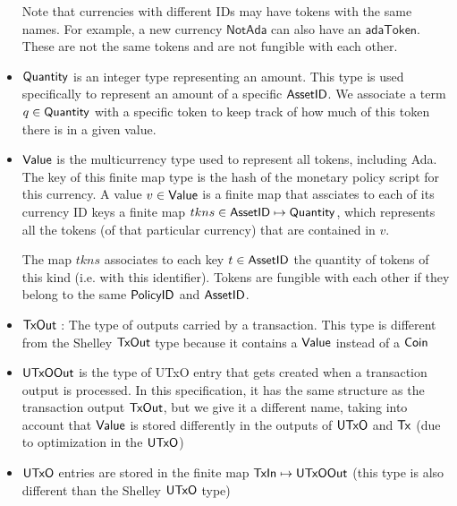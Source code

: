 \begin{itemize}
  Note that currencies with different IDs may have tokens with the same names.
  For example, a new currency $\mathsf{NotAda}$ can also have an $\mathsf{adaToken}$.
  These are not the same tokens and are not fungible with each other.

  \item $\mathsf{Quantity}$ is an integer type representing an amount. This type is used
  specifically to represent an amount of a specific $\mathsf{AssetID}$. We associate
  a term $q\in\mathsf{Quantity}$ with a specific token to keep track of how much of
  this token there is in a given value.

  \item $\mathsf{Value}$ is the multicurrency type used to represent
  all tokens, including Ada. The key of this finite map type is
  the hash of the monetary policy script for this currency.
  A value $v\in\mathsf{Value}$ is a finite map that assciates to each of its
  currency ID keys a finite map $tkns\in\mathsf{AssetID} \mapsto \mathsf{Quantity}$,
  which represents all the tokens (of that particular
  currency) that are contained in $v$.

  The map $tkns$ associates to each key $t\in\mathsf{AssetID}$ the quantity of tokens of
  this kind (i.e. with this identifier). Tokens are fungible with each other if
  they belong to the same $\mathsf{PolicyID}$ and $\mathsf{AssetID}$.

  \item $\mathsf{TxOut}$ : The type of outputs carried by a transaction. This type
  is different from the Shelley $\mathsf{TxOut}$ type because it contains a $\mathsf{Value}$
  instead of a $\mathsf{Coin}$

  \item $\mathsf{UTxOOut}$ is the type of UTxO entry that gets created when a transaction
  output is processed. In this specification, it has the same structure as
  the transaction output $\mathsf{TxOut}$, but we give it a different name, taking into
  account that $\mathsf{Value}$ is stored differently in the outputs of $\mathsf{UTxO}$ and $\mathsf{Tx}$
  (due to optimization in the $\mathsf{UTxO}$)

  \item $\mathsf{UTxO}$ entries are stored in the finite map $\mathsf{TxIn}\mapsto \mathsf{UTxOOut}$
  (this type is also different than the Shelley $\mathsf{UTxO}$ type)

\end{itemize}


